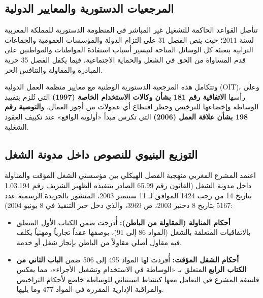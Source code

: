 \subsection{المرجعيات الدستورية والمعايير الدولية}
تتأصل القواعد الحاكمة للتشغيل غير المباشر في المنظومة الدستورية للمملكة المغربية لسنة \textenglish{2011}؛ حيث ينص الفصل \textenglish{31} على التزام الدولة والمؤسسات العمومية والجماعات الترابية بتعبئة كل الوسائل المتاحة لتيسير أسباب استفادة المواطنات والمواطنين على قدم المساواة من الحق في الشغل والحماية الاجتماعية، فيما يكفل الفصل \textenglish{35} حرية المبادرة والمقاولة والتنافس الحر.

وتتكامل هذه المرجعية الدستورية الوطنية مع معايير منظمة العمل الدولية (\textenglish{OIT})، وعلى رأسها \textbf{الاتفاقية رقم \textenglish{181} بشأن وكالات الاستخدام الخاصة (\textenglish{1997})} التي تُلزم بتقييد الوساطة وإخضاعها للترخيص وحظر اقتطاع أي عمولات من أجور العمال، و\textbf{التوصية رقم \textenglish{198} بشأن علاقة العمل (\textenglish{2006})} التي تكرس مبدأ «أولوية الواقع» عند تكييف العقود الشغلية.

\subsection{التوزيع البنيوي للنصوص داخل مدونة الشغل}
اعتمد المشرع المغربي منهجية الفصل الهيكلي بين مؤسستي الشغل المؤقت والمناولة داخل مدونة الشغل (القانون رقم \textenglish{65.99} الصادر بتنفيذه الظهير الشريف رقم \textenglish{1.03.194} بتاريخ \textenglish{14} من رجب \textenglish{1424} الموافق لـ \textenglish{11} سبتمبر \textenglish{2003}، المنشور بالجريدة الرسمية عدد \textenglish{5167} بتاريخ \textenglish{8} دجنبر \textenglish{2003}، ص \textenglish{3969}، والذي دخل حيز التنفيذ في \textenglish{8} يونيو \textenglish{2004}):
\begin{itemize}[leftmargin=*, itemsep=5pt]
    \item \textbf{أحكام المناولة (المقاولة من الباطن):} أُدرجت ضمن الكتاب الأول المتعلق بالاتفاقيات المتعلقة بالشغل (المواد \textenglish{86} إلى \textenglish{91})، بوصفها عقداً تجارياً ومهنياً يكلف فيه مقاول أصلي مقاولاً من الباطن بإنجاز شغل أو خدمة.
    \item \textbf{أحكام الشغل المؤقت:} أُفردت لها المواد \textenglish{495} إلى \textenglish{506} ضمن \textbf{الباب الثاني من الكتاب الرابع} المتعلق بـ «الوساطة في الاستخدام وتشغيل الأجراء»، مما يعكس فلسفة المشرع في التعامل معها كنشاط استثنائي للوساطة خاضع لأحكام التراخيص والمراقبة الإدارية المقررة في المواد \textenglish{477} وما يليها.
\end{itemize}

